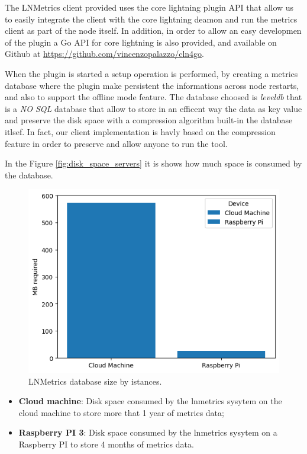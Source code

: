 The LNMetrics client provided uses the core lightning plugin API
that allow us to easily integrate the client with the core lightning deamon 
and run the metrics client as part of the node itself. 
In addition, in order to allow an easy developmen of the plugin a 
Go API for core lightning is also provided, and available on 
Github at \url{https://github.com/vincenzopalazzo/cln4go}.

When the plugin is started a setup operation is performed, by creating a 
metrics database where the plugin make persistent the informations 
across node restarts, and also to support the offline mode feature. 
The database choosed is \emph{leveldb} that is a \emph{NO SQL} database 
that allow to store in an efficent way the data as key value and preserve
the disk space with a compression algorithm built-in the database itlsef.
In fact, our client implementation is havly based on the 
compression feature in order to preserve and allow anyone to 
run the tool. 

In the Figure \ref{fig:disk_space_servers} it is shows how much space is 
consumed by the database. 

\begin{figure}
    \begin{center}
    \includegraphics[scale=0.7]{imgs/disk_space_servers.png}
    \end{center}
    \caption{LNMetrics database size by istances.}
    \label{fig:lnmetrics_diskspace}
\end{figure}

\begin{itemize}
    \item {\bf Cloud machine}: Disk space consumed by the lnmetrics 
        sysytem on the cloud machine to store more that 1 year of metrics data;
    \item {\bf Raspberry PI 3}: Disk space consumed by the lnmetrics sysytem
        on a Raspberry PI to store 4 months of metrics data.
\end{itemize}

